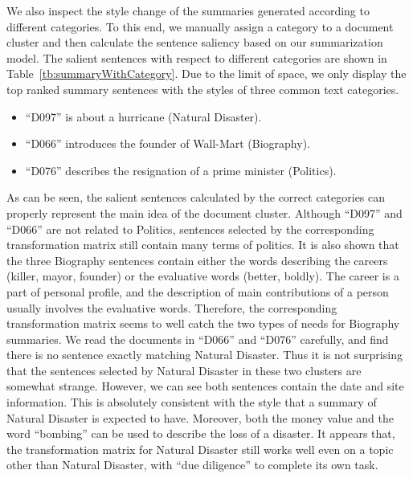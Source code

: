 \documentclass[letterpaper]{article}
\begin{document}
We also inspect the style change of the summaries generated according to different categories.
To this end, we manually assign a category to a document cluster and then calculate the sentence saliency based on our summarization model.
The salient sentences with respect to different categories are shown in Table~\ref{tb:summaryWithCategory}.
Due to the limit of space, we only display the top ranked summary sentences with the styles of three common text categories.
\begin{itemize}
	\item ``D097'' is about a hurricane (Natural Disaster).
	\item ``D066'' introduces the founder of Wall-Mart (Biography).
	\item ``D076'' describes the resignation of a prime minister (Politics).
\end{itemize}
As can be seen, the salient sentences calculated by the correct categories can properly represent the main idea of the document cluster.
Although ``D097'' and ``D066'' are not related to Politics, sentences selected by the corresponding transformation matrix still contain many terms of politics.
It is also shown that the three Biography sentences contain either the words describing the careers (killer, mayor, founder) or the evaluative words (better, boldly).
The career is a part of personal profile, and the description of main contributions of a person usually involves the evaluative words.
Therefore, the corresponding transformation matrix seems to well catch the two types of needs for Biography summaries.
We read the documents in ``D066'' and ``D076'' carefully, and find there is no sentence exactly matching Natural Disaster.
Thus it is not surprising that the sentences selected by Natural Disaster in these two clusters are somewhat strange.
However, we can see both sentences contain the date and site information.
This is absolutely consistent with the style that a summary of Natural Disaster is expected to have.
Moreover, both the money value and the word ``bombing'' can be used to describe the loss of a disaster.
It appears that, the transformation matrix for Natural Disaster still works well even on a topic other than Natural Disaster, with ``due diligence'' to complete its own task.
\end{document}
